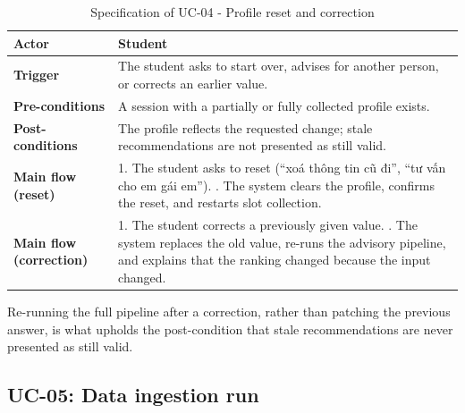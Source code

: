\documentclass[../main.tex]{subfiles}
\begin{document}
\begin{table}[H]
    \centering
    \caption{Specification of UC-04 - Profile reset and correction}
    \label{table:uc04}
    \begin{tabular}{|p{3.2cm}|p{10.3cm}|}
        \hline
        \textbf{Actor} & Student \\
        \hline
        \textbf{Trigger} & The student asks to start over, advises for another person, or corrects an earlier value. \\
        \hline
        \textbf{Pre-conditions} & A session with a partially or fully collected profile exists. \\
        \hline
        \textbf{Post-conditions} & The profile reflects the requested change; stale recommendations are not presented as still valid. \\
        \hline
        \textbf{Main flow (reset)} &
        1. The student asks to reset (``xoá thông tin cũ đi'', ``tư vấn cho em gái em''). \newline
        2. The system clears the profile, confirms the reset, and restarts slot collection. \\
        \hline
        \textbf{Main flow (correction)} &
        1. The student corrects a previously given value. \newline
        2. The system replaces the old value, re-runs the advisory pipeline, and explains that the ranking changed because the input changed. \\
        \hline
    \end{tabular}
\end{table}

Re-running the full pipeline after a correction, rather than patching the previous answer, is what upholds the post-condition that stale recommendations are never presented as still valid.

\subsection{UC-05: Data ingestion run}
\end{document}
